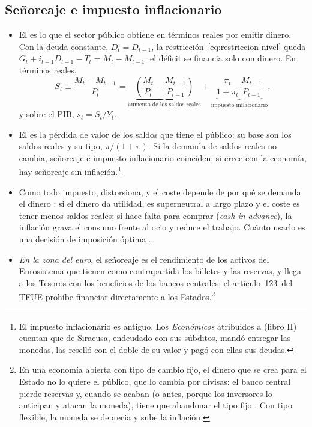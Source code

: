 \documentclass[11pt]{article}
\begin{document}
\subsection{Señoreaje e impuesto inflacionario}\label{sec:senoreaje}

\begin{itemize}
\item El  es lo que el sector público obtiene en términos reales por emitir dinero. Con la deuda constante, $D_t=D_{t-1}$, la restricción~\eqref{eq:restriccion-nivel} queda $G_t+i_{t-1}D_{t-1}-T_t=M_t-M_{t-1}$: el déficit se financia solo con dinero. En términos reales,
  \begin{equation}\label{eq:senoreaje}
  S_t\equiv\frac{M_t-M_{t-1}}{P_t}=\underbrace{\left(\frac{M_t}{P_t}-\frac{M_{t-1}}{P_{t-1}}\right)}_{\text{aumento de los saldos reales}}+\underbrace{\frac{\pi_t}{1+\pi_t}\,\frac{M_{t-1}}{P_{t-1}}}_{\text{impuesto inflacionario}},
  \end{equation}
  y sobre el PIB, $s_t=S_t/Y_t$.
\item El  es la pérdida de valor de los saldos que tiene el público: su base son los saldos reales y su tipo, $\pi/(1+\pi)$. Si la demanda de saldos reales no cambia, señoreaje e impuesto inflacionario coinciden; si crece con la economía, hay señoreaje sin inflación.\footnote{El impuesto inflacionario es antiguo. Los \emph{Económicos} atribuidos a  (libro II) cuentan que  de Siracusa, endeudado con sus súbditos, mandó entregar las monedas, las reselló con el doble de su valor y pagó con ellas sus deudas.}
\item Como todo impuesto, distorsiona, y el coste depende de por qué se demanda el dinero : si el dinero da utilidad\nocite{Sidrauski1967Rational}, es superneutral a largo plazo y el coste es tener menos saldos reales; si hace falta para comprar (\emph{cash-in-advance}), la inflación grava el consumo frente al ocio y reduce el trabajo\nocite{Walsh2017Monetary}. Cuánto usarlo es una decisión de imposición óptima .
\item \emph{En la zona del euro}, el señoreaje es el rendimiento de los activos del Eurosistema que tienen como contrapartida los billetes y las reservas, y llega a los Tesoros con los beneficios de los bancos centrales; el artículo~123~del TFUE prohíbe financiar directamente a los Estados\nocite{TFUE2016}.\footnote{En una economía abierta con tipo de cambio fijo, el dinero que se crea para el Estado no lo quiere el público, que lo cambia por divisas: el banco central pierde reservas y, cuando se acaban (o antes, porque los inversores lo anticipan y atacan la moneda), tiene que abandonar el tipo fijo\nocite{Krugman1979Model} . Con tipo flexible, la moneda se deprecia y sube la inflación.}
\end{itemize}
\end{document}
